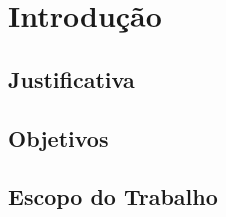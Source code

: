 
\chapter{Introdução}
\label{ch:intro}

\section{Justificativa}


\section{Objetivos}


\section{Escopo do Trabalho}